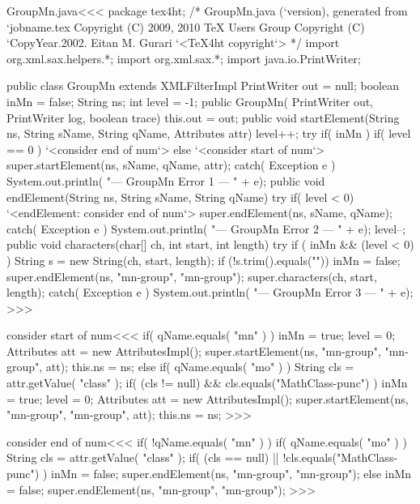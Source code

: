 \documentclass{article}
\begin{document}
 
\<GroupMn.java\><<< 
package tex4ht;
/* GroupMn.java (`version), generated from `jobname.tex
   Copyright (C) 2009, 2010 TeX Users Group
   Copyright (C) `CopyYear.2002. Eitan M. Gurari
`<TeX4ht copyright`> */
import org.xml.sax.helpers.*; 
import org.xml.sax.*; 
import java.io.PrintWriter; 
 
public class GroupMn extends XMLFilterImpl { 
     PrintWriter out = null; 
     boolean inMn = false;
     String ns;
     int level = -1;
   public GroupMn( PrintWriter out, PrintWriter log, boolean trace){ 
     this.out = out; 
   } 
   public void startElement(String ns, String sName, 
                           String qName, Attributes attr) { 
      level++;
      try{ 
        if( inMn ){ 
           if( level == 0 ){ `<consider end of num`> }
        } else { `<consider start of num`> } 
        super.startElement(ns, sName, qName, attr); 
      } catch( Exception e ){
        System.out.println( "--- GroupMn Error 1 --- " + e);
      } 
   }   
   public void endElement(String ns, String sName, String qName){ 
      try{ 
        if( level < 0) { 
          `<endElement: consider end of num`>
        }
        super.endElement(ns, sName, qName); 
      } catch( Exception e ){
        System.out.println( "--- GroupMn Error 2 --- " + e);
      } 
      level--;
   }   
   public void characters(char[] ch, int start, int length){ 
      try{ 
        if ( inMn  && (level < 0) ) {
           String s = new String(ch, start, length);
           if (!s.trim().equals("")) {
             inMn = false;
             super.endElement(ns, "mn-group", "mn-group");
        }  }
        super.characters(ch, start, length); 
      } catch( Exception e ){
        System.out.println( "--- GroupMn Error 3 --- " + e);
}  }  } 
>>> 

\<consider start of num\><<<
if( qName.equals( "mn" ) ){
   inMn = true; level = 0;
   Attributes att = new AttributesImpl();
   super.startElement(ns, "mn-group", "mn-group", att); 
   this.ns = ns;
} else if( qName.equals( "mo" ) ){
   String cls = attr.getValue( "class" );
   if( (cls != null) && cls.equals("MathClass-punc") ){
      inMn = true; level = 0;
      Attributes att = new AttributesImpl();
      super.startElement(ns, "mn-group", "mn-group", att); 
      this.ns = ns;
}  }
>>>

\<consider end of num\><<<
if( !qName.equals( "mn" ) ){
  if( qName.equals( "mo" ) ){
     String cls = attr.getValue( "class" );
     if( (cls == null) || !cls.equals("MathClass-punc") ){
        inMn = false;  
        super.endElement(ns, "mn-group", "mn-group"); 
     }
  } else {
     inMn = false;
     super.endElement(ns, "mn-group", "mn-group"); 
} }
>>>
\end{document}
